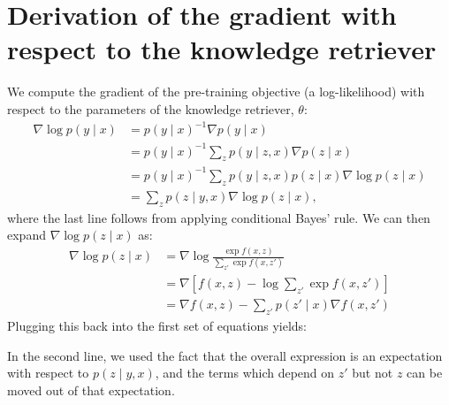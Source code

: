 

\section{Derivation of the gradient with respect to the knowledge retriever}

We compute the gradient of the \thename pre-training objective (a log-likelihood)
with respect to the parameters of the knowledge retriever, $\theta$:
\begin{align*}
\nabla\log p(y\mid x) &= p(y\mid x)^{-1}\nabla p(y\mid x) \\
 &= p(y\mid x)^{-1}\sum_{z}p(y\mid z,x)\nabla p(z\mid x) \\
 &= p(y\mid x)^{-1}\sum_{z}p(y\mid z,x)p(z\mid x)\nabla\log p(z\mid x) \\
 & =\sum_{z}p(z\mid y,x)\nabla\log p(z\mid x),
\end{align*}
where the last line follows from applying conditional Bayes' rule.
We can then expand $\nabla\log p\left(z\mid x\right)$ as:
%
\begin{align*}
\nabla\log p(z\mid x) &= \nabla\log\frac{\exp f(x,z)}{\sum_{z'}\exp f(x,z')} \\
 &= \nabla\left[f(x,z)-\log\sum_{z'}\exp f(x,z')\right] \\
 &= \nabla f(x,z)-\sum_{z'}p(z'\mid x)\nabla f(x,z')
\end{align*}
Plugging this back into the first set of equations yields:
%

In the second line, we used the fact that the overall expression is
an expectation with respect to $p\left(z\mid y,x\right)$, and the
terms which depend on $z'$ but not $z$ can be moved out of that
expectation.


